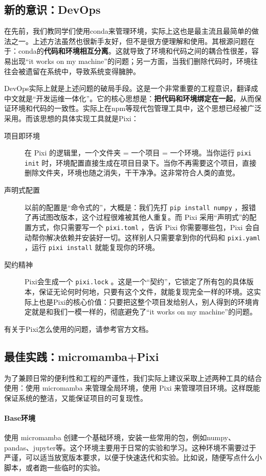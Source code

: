 \subsection{新的意识：DevOps}

在先前，我们教同学们使用conda来管理环境，实际上这也是最主流且最简单的做法之一。上述方法虽然也很新手友好，但不是很方便理解和使用。其根源问题在于：conda的\textbf{代码和环境相互分离}。这就导致了环境和代码之间的耦合性很差，容易出现“it works on my machine”的问题；另一方面，当我们删除代码时，环境往往会被遗留在系统中，导致系统变得臃肿。

DevOps实际上就是上述问题的破局手段。这是一个非常重要的工程意识，翻译成中文就是“开发运维一体化”。它的核心思想是：\textbf{把代码和环境绑定在一起}，从而保证环境和代码的一致性。实际上在npm等现代包管理工具中，这个思想已经被广泛采用。而该思想的具体实现工具就是Pixi：
\begin{description}
    \item[项目即环境] 在 Pixi 的逻辑里，一个文件夹 = 一个项目 = 一个环境。当你运行 \verb|pixi init| 时，环境配置直接生成在项目目录下。当你不再需要这个项目，直接删除文件夹，环境也随之消失，干干净净。这非常符合人类的直觉。 
    \item[声明式配置] 以前的配置是“命令式的”，大概是：我们先打 \verb|pip install numpy| ，报错了再试图改版本，这个过程很难被其他人重复。而 Pixi 采用“声明式”的配置方式，你只需要写一个 \verb|pixi.toml| ，告诉 Pixi 你需要哪些包，Pixi 会自动帮你解决依赖并安装好一切。这样别人只需要拿到你的代码和 \verb|pixi.yaml| ，运行 \verb|pixi install| 就能复现你的环境。 
    \item[契约精神] Pixi会生成一个 \verb|pixi.lock| 。这是一个“契约”，它锁定了所有包的具体版本，保证无论何时何地，只要有这个文件，就能复现完全一样的环境。这实际上也是Pixi的核心价值：只要把这整个项目发给别人，别人得到的环境肯定就是和我们一模一样的，彻底避免了“it works on my machine”的问题。
\end{description}
有关于Pixi怎么使用的问题，请参考官方文档。

\subsection{最佳实践：micromamba+Pixi}

为了兼顾日常的便利性和工程的严谨性，我们实际上建议采取上述两种工具的结合使用：使用 micromamba 来管理全局环境，使用 Pixi 来管理项目环境。这样既能保证系统的整洁，又能保证项目的可复现性。

\paragraph{Base环境} 使用 micromamba 创建一个基础环境，安装一些常用的包，例如numpy、pandas、jupyter等。这个环境主要用于日常的实验和学习。这种环境不需要过于严谨，可以适当放宽版本要求，以便于快速迭代和实验。比如说，随便写点什么小脚本，或者跑一些临时的实验。

